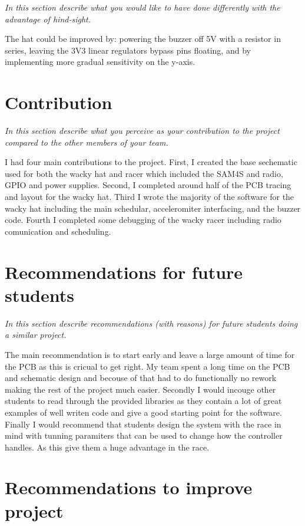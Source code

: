 \documentclass[a4paper,12pt]{article}
\newcommand{\comment}[1]{\emph{\color{blue}#1}}
\begin{document}
\comment{In this section describe what you would like to have done
  differently with the advantage of hind-sight.}

The hat could be improved by: powering the buzzer off 5V with a resistor in series, leaving the 3V3 linear regulators bypass pins floating, and by implementing more gradual sensitivity on the y-axis. 

\section{Contribution}

\comment{In this section describe what you perceive as your contribution
  to the project compared to the other members of your team.}

I had four main contributions to the project. First, I created the base sechematic used for both the wacky hat and racer which included the SAM4S and radio, GPIO and power supplies. Second, I completed around half of the PCB tracing and layout for the wacky hat. Third I wrote the majority of the software for the wacky hat including the main schedular, acceleromiter interfacing, and the buzzer code. Fourth I completed some debugging of the wacky racer including radio comunication and scheduling. 


\section{Recommendations for future students}

\comment{In this section describe recommendations (with reasons) for
  future students doing a similar project.}

The main recommendation is to start early and leave a large amount of time for the PCB as this is cricual to get right. My team spent a long time on the PCB and schematic design and becouse of that had to do functionally no rework making the rest of the project much easier. Secondly I would incouge other students to read through the provided libraries as they contain a lot of great examples of well writen code and give a good starting point for the software. Finally I would recommend that students design the system with the race in mind with tunning paramiters that can be used to change how the controller handles. As this give them a huge advantage in the race.

\section{Recommendations to improve project}
\end{document}
